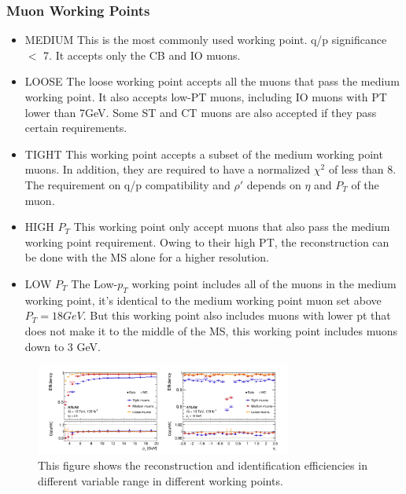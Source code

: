 \subsubsection*{Muon Working Points}
\begin{itemize}

\item MEDIUM \newline
This is the most commonly used working point. q/p significance $<$ 7. It accepts only the CB and IO muons.  

\item LOOSE \newline
    The loose working point accepts all the muons that pass the medium working point. It also accepts low-PT muons, including IO muons with PT lower than 7GeV. Some ST and CT muons are also accepted if they pass certain requirements. 

\item TIGHT \newline
    This working point accepts a subset of the medium working point muons. In addition, they are required to have a normalized $\chi^{2}$ of less than 8. The requirement on q/p compatibility and $\rho'$ depends on $\eta$ and $P_{T}$ of the muon.

\item HIGH $P_{T}$ \newline
This working point only accept muons that also pass the medium working point requirement. Owing to their high PT, the reconstruction can be done with the MS alone for a higher resolution.


\item LOW $P_{T}$ \newline
The Low-$p_{T}$ working point includes all of the muons in the medium working point, it's identical to the medium working point muon set above $P_{T}=18GeV$. But this working point also includes muons with lower pt that does not make it to the middle of the MS, this working point includes muons down to 3 GeV. 

\end{itemize}

\begin{figure}[!htb]
    \begin{center}
        \includegraphics[width=0.75\textwidth]{figures/common_ana/IdentificationEff}
        \caption{
            This figure shows the reconstruction and identification efficiencies in different variable range in different working points\cite{Aad:2746302}.
    }
        \label{fig:isolationWP}
    \end{center}
\end{figure}



